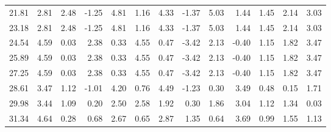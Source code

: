 \documentclass{article}
\begin{document}
\begin{tabular}{rrrrrrrrrrrrr}
   21.81 &     2.81 &     2.48 &    -1.25 &     4.81  &     1.16 &     4.33 &    -1.37 &     5.03 &     1.44 &     1.45  &     2.14 &     3.03  \\ 
   23.18 &     2.81 &     2.48 &    -1.25 &     4.81  &     1.16 &     4.33 &    -1.37 &     5.03 &     1.44 &     1.45  &     2.14 &     3.03  \\ 
   24.54 &     4.59 &     0.03 &     2.38 &     0.33  &     4.55 &     0.47 &    -3.42 &     2.13 &    -0.40 &     1.15  &     1.82 &     3.47  \\ 
   25.89 &     4.59 &     0.03 &     2.38 &     0.33  &     4.55 &     0.47 &    -3.42 &     2.13 &    -0.40 &     1.15  &     1.82 &     3.47  \\ 
   27.25 &     4.59 &     0.03 &     2.38 &     0.33  &     4.55 &     0.47 &    -3.42 &     2.13 &    -0.40 &     1.15  &     1.82 &     3.47  \\ 
   28.61 &     3.47 &     1.12 &    -1.01 &     4.20  &     0.76 &     4.49 &    -1.23 &     0.30 &     3.49 &     0.48  &     0.15 &     1.71  \\ 
   29.98 &     3.44 &     1.09 &     0.20 &     2.50  &     2.58 &     1.92 &     0.30 &     1.86 &     3.04 &     1.12  &     1.34 &     0.03  \\ 
   31.34 &     4.64 &     0.28 &     0.68 &     2.67  &     0.65 &     2.87 &     1.35 &     0.64 &     3.69 &     0.99  &     1.55 &     1.13  \\ \hline 
\end{tabular}
\end{document}
